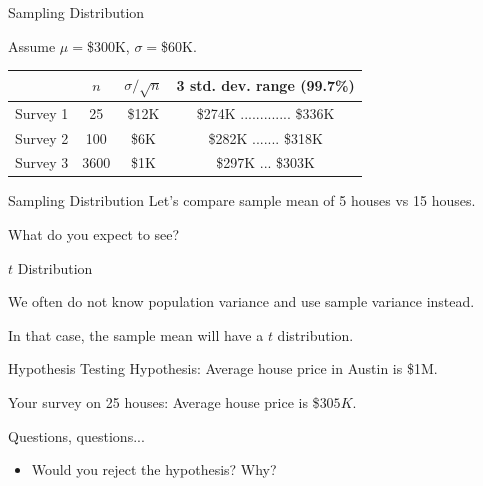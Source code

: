 \documentclass{beamer}\usepackage[]{graphicx}\usepackage[]{color}
\begin{document}
\begin{darkframes}
    \begin{frame}[label=lists]{Sampling Distribution}
    
    Assume $\mu=$\$300K, $\sigma=$\$60K. \newline
    
   	\begin{table}[!b]
        {\carlitoTLF %
        \begin{tabularx}{\textwidth}{Xccc}
          \textbf{} &  $n$ & $\sigma/\sqrt{n}$  & 3 std. dev. range (99.7\%) \\
          \toprule
          Survey 1     & 25   &  \$12K	&\$274K ............. \$336K   \\
          Survey 2     & 100  &  \$6K	&\$282K ....... \$318K   \\
		  Survey 3     & 3600 &  \$1K	&\$297K ... \$303K   \\
          \bottomrule
        \end{tabularx}}	
	\end{table}   
    
    \end{frame}
    
    
	\begin{frame}[label=lists]{Sampling Distribution}
		Let's compare sample mean of 5 houses vs 15 houses. \newline
		
		What do you expect to see?
	\end{frame}
	

    
    
    \begin{frame}[label=lists]{$t$ Distribution}
    
    	We often do not know population variance and use sample variance instead. \newline
    	
    	
		In that case, the sample mean will have a \alert{$t$ distribution}.
	\end{frame}	
    
    
    
    \begin{frame}[label=lists]{Hypothesis Testing}
    Hypothesis: Average house price in Austin is \$1M. \pause
    
    Your survey on 25 houses: Average house price is \$$305K$. \newline \pause
    
    Questions, questions... \pause
    \begin{itemize}
   \item Would you reject the hypothesis? Why? \pause
    

\end{itemize}
\end{frame}
\end{darkframes}
\end{document}
